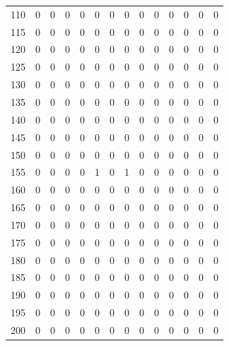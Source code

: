 \documentclass[preprint,12pt]{elsarticle}
\begin{document}
\begin{table}[ht]
\begin{tabular}{|c||rrr|r||rr|r||rr|r||rr|r|}
  110 &   0 &   0 &   0 &  0 &  0 &   0 &   0 &   0 &   0&   0 &   0 &   0  &   0 \\ 
  115 &   0 &   0 &   0 &  0 &  0 &   0 &   0 &   0 &   0 &   0 &   0 &   0 &   0 \\ 
  120 &   0 &   0 &   0 &  0 &  0 &   0 &   0 &   0 &   0 &   0 &   0 &   0 &   0 \\ 
  125 &   0 &   0 &   0 &  0 &  0 &   0 &   0 &   0 &   0 &   0 &   0 &   0 &   0 \\ 
  130 &   0 &   0 &   0 &  0 &  0 &   0 &   0 &   0 &   0 &   0 &   0 &   0 &   0 \\ 
  135 &   0 &   0 &   0 &  0 &  0 &   0 &   0 &   0 &   0 &   0 &   0 &   0 &   0 \\ 
  140 &   0 &   0 &   0 &  0 &  0 &   0 &   0 &   0 &   0 &   0 &   0 &   0 &   0 \\ 
  145 &   0 &   0 &   0 &  0 &  0 &   0 &   0 &   0 &   0 &   0 &   0 &   0 &   0 \\ 
  150 &   0 &   0 &   0 &  0 &  0 &   0 &   0 &   0 &   0 &   0 &   0 &   0 &   0 \\ 
  155 &   0 &   0 &   0 &  0 &  1 &   0 & 1 &  0 &   0 &   0 &   0 &   0 &   0 \\ 
  160 &   0 &   0 &   0 &  0 &  0 &   0 &   0 &   0 &   0 &   0 &   0 &   0 &   0 \\ 
  165 &   0 &   0 &   0 &  0 &  0 &   0 &   0 &   0 &   0 &   0 &   0 &   0 &   0 \\ 
  170 &   0 &   0 &   0 &  0 &  0 &   0 &   0 &   0 &   0 &   0 &   0 &   0 &   0 \\ 
  175 &   0 &   0 &   0 &   0 &  0 &   0 &   0 &   0 &   0 &   0 &   0 &   0 &   0 \\ 
  180 &   0 &   0 &   0 &  0 &   0 &   0 &   0 &   0 &   0 &   0 &   0 &   0 &   0 \\ 
  185 &   0 &   0 &   0 &  0 &   0 &   0 &   0 &   0 &   0 &   0 &   0 &   0 &   0 \\ 
  190 &   0 &   0 &   0 &  0 &   0 &   0 &   0 &   0 &   0 &   0 &   0 &   0 &   0 \\ 
  195 &   0 &   0 &   0 &   0 &  0 &   0 &   0 &   0 &   0 &   0 &   0 &   0 &   0 \\ 
  200 &   0 &   0 &   0 &   0 &  0 &   0 &   0 &   0 &   0 &   0 &   0 &   0 &   0 \\ 
   \hline
\end{tabular}
\end{table}
\end{document}
